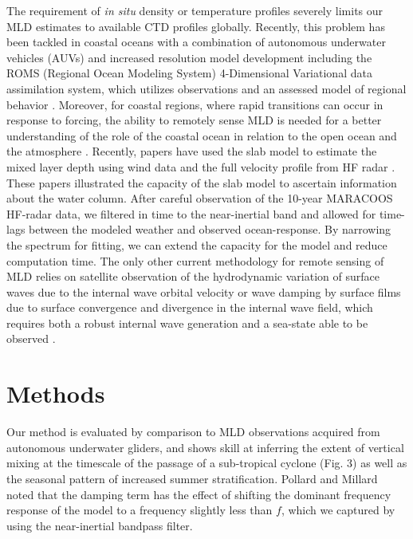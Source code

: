 \documentclass{article}
\begin{document}
The requirement of \textit{in situ} density or temperature profiles severely limits our MLD estimates to available CTD profiles globally. 
Recently, this problem has been tackled in coastal oceans with a combination of autonomous underwater vehicles (AUVs) and increased resolution model development including the ROMS (Regional Ocean Modeling System) 4-Dimensional Variational data assimilation system, which utilizes observations and an assessed model of regional behavior \cite{Jeronimo2010,wilkin2013assessment,Stranne2018,levin2018mean}. 
Moreover, for coastal regions, where rapid transitions can occur in response to forcing, the ability to remotely sense MLD is needed for a better understanding of the role of the coastal ocean in relation to the open ocean and the atmosphere \cite{Shay2003,Miles2013,Zhang2018}.
Recently, papers have used the slab model to estimate the mixed layer depth using wind data and the full velocity profile from HF radar \cite{Shrira2015, Zervakis2017}. 
These papers illustrated the capacity of the slab model to ascertain information about the water column. 
After careful observation of the 10-year MARACOOS HF-radar data, we filtered in time to the near-inertial band and allowed for time-lags between the modeled weather and observed ocean-response. 
By narrowing the spectrum for fitting, we can extend the capacity for the model and reduce computation time.
The only other current methodology for remote sensing of MLD relies on satellite observation of the hydrodynamic variation of surface waves due to the internal wave orbital velocity or wave damping by surface
films due to surface convergence and divergence in the internal wave field, which requires both a robust internal wave generation and a sea-state able to be observed \cite{Li2000}.


\section*{Methods}
Our method is evaluated by comparison to MLD observations acquired from autonomous underwater gliders, and shows skill at inferring the extent of vertical mixing at the timescale of the passage of a sub-tropical cyclone (Fig. 3) as well as the seasonal pattern of increased summer stratification. 
Pollard and Millard \cite{Pollard1970a} noted that the damping term has the effect of shifting the dominant frequency response of the model to a frequency slightly less than $f$, which we captured by using the near-inertial bandpass filter.
\end{document}
